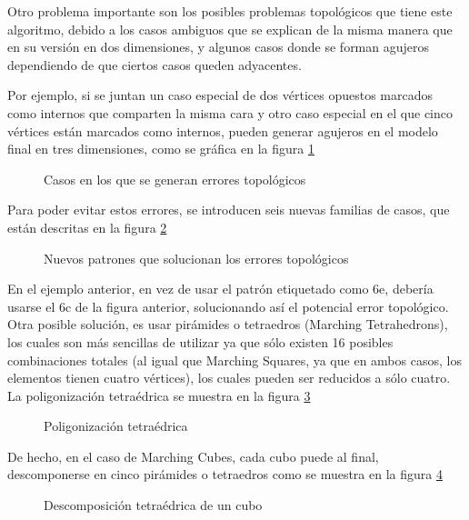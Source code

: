 Otro problema importante son los posibles problemas topológicos que tiene este 
algoritmo, debido a los casos ambiguos que se explican de la misma manera que en su versión en 
dos dimensiones, y algunos casos donde se forman agujeros dependiendo de que ciertos casos 
queden adyacentes.

Por ejemplo, si se juntan un caso especial de dos vértices opuestos marcados como 
internos que comparten la misma cara y otro caso especial en el que cinco vértices están 
marcados como internos, pueden generar agujeros en el modelo final en tres dimensiones, como 
se gráfica en la figura \ref{f:estadoDelArte:MCAmbEx}

\begin{figure}[htbp]
\centering
\caption{Casos en los que se generan errores topológicos}
\label{f:estadoDelArte:MCAmbEx}
\end{figure}

Para poder evitar estos errores, se introducen seis nuevas familias de casos, que están descritas en
la figura \ref{f:estadoDelArte:MCAmb}

\begin{figure}[htb]
\centering
\caption{Nuevos patrones que solucionan los errores topológicos}
\label{f:estadoDelArte:MCAmb}
\end{figure}

En el ejemplo anterior, en vez de usar el patrón etiquetado como 6e, debería usarse el 6c 
de la figura anterior, solucionando así el potencial error topológico.
Otra posible solución, es usar pirámides o tetraedros (Marching Tetrahedrons), los cuales 
son más sencillas de utilizar ya que sólo existen 16 posibles combinaciones totales (al igual que 
Marching Squares, ya que en ambos casos, los elementos tienen cuatro vértices), los cuales 
pueden ser reducidos a sólo cuatro. La poligonización tetraédrica se muestra en la figura \ref{f:estadoDelArte:image_004}

\begin{figure}[htb]
\centering
\caption{Poligonización tetraédrica}
\label{f:estadoDelArte:image_004}
\end{figure}

De hecho, en el caso de Marching Cubes, cada cubo puede al final, descomponerse en 
cinco pirámides o tetraedros como se muestra en la figura \ref{f:estadoDelArte:image_006}

\begin{figure}[htb]
\centering
\caption{Descomposición tetraédrica de un cubo}
\label{f:estadoDelArte:image_006}
\end{figure}
